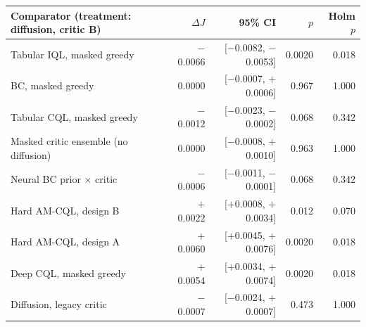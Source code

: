 \begin{tabular}{lrrrr}
\toprule
Comparator (treatment: diffusion, critic B) & $\Delta J$ & 95\% CI & $p$ & Holm $p$ \\
\midrule
Tabular IQL, masked greedy & $-$0.0066 & [$-$0.0082, $-$0.0053] & 0.0020 & 0.018 \\
BC, masked greedy & 0.0000 & [$-$0.0007, $+$0.0006] & 0.967 & 1.000 \\
Tabular CQL, masked greedy & $-$0.0012 & [$-$0.0023, $-$0.0002] & 0.068 & 0.342 \\
Masked critic ensemble (no diffusion) & 0.0000 & [$-$0.0008, $+$0.0010] & 0.963 & 1.000 \\
Neural BC prior $\times$ critic & $-$0.0006 & [$-$0.0011, $-$0.0001] & 0.068 & 0.342 \\
Hard AM-CQL, design B & $+$0.0022 & [$+$0.0008, $+$0.0034] & 0.012 & 0.070 \\
Hard AM-CQL, design A & $+$0.0060 & [$+$0.0045, $+$0.0076] & 0.0020 & 0.018 \\
Deep CQL, masked greedy & $+$0.0054 & [$+$0.0034, $+$0.0074] & 0.0020 & 0.018 \\
Diffusion, legacy critic & $-$0.0007 & [$-$0.0024, $+$0.0007] & 0.473 & 1.000 \\
\bottomrule
\end{tabular}
